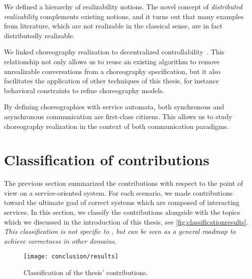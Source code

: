 \begin{niceitemize}
\item We defined a hierarchy of realizability notions. The novel concept of \emph{distributed realizability} complements existing notions, and it turns out that many examples from literature, which are not realizable in the classical sense, are in fact distributedly realizable.

\item We linked choreography realization to decentralized controllability~\cite{Wolf_2008_topnoc}. This relationship not only allows us to reuse an existing algorithm to remove unrealizable conversations from a choreography specification, but it also facilitates the application of other techniques of this thesis, for instance behavioral constraints to refine choreography models.

\item By defining choreographies with service automata, both synchronous and asynchro\-nous communication are first-class citizens. This allows us to study choreography realization in the context of both communication paradigms.
\end{niceitemize}





\section{Classification of contributions}

The previous section summarized the contributions with respect to the point of view on a service-oriented system. For each scenario, we made contributions toward the ultimate goal of correct systems which are composed of interacting services. In this section, we classify the contributions alongside with the topics which we discussed in the introduction of this thesis, see \autoref{fig:classificationresults}. {\em This classification is not specific to , but can be seen as a general roadmap to achieve correctness in other domains.}

\begin{figure}
\centering
\texttt{[image: conclusion/results]}
\caption{Classification of the thesis' contributions.}\label{fig:classificationresults}
\end{figure}




